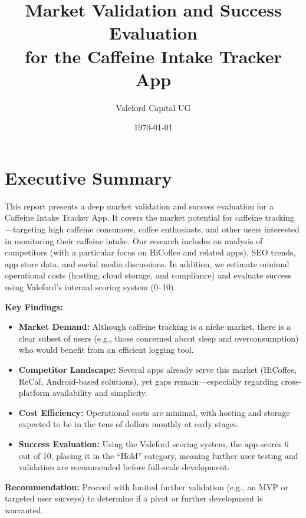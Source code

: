 \documentclass[11pt]{article}
\title{\Huge \textbf{Market Validation and Success Evaluation}\\[0.5em]
\large for the Caffeine Intake Tracker App}
\author{Valeford Capital UG}
\date{\today}
\begin{document}
\maketitle
\thispagestyle{empty}
\newpage

\tableofcontents
\newpage

\section*{Executive Summary}
This report presents a deep market validation and success evaluation for a Caffeine Intake Tracker App. It covers the market potential for caffeine tracking—targeting high caffeine consumers, coffee enthusiasts, and other users interested in monitoring their caffeine intake. Our research includes an analysis of competitors (with a particular focus on HiCoffee and related apps), SEO trends, app store data, and social media discussions. In addition, we estimate minimal operational costs (hosting, cloud storage, and compliance) and evaluate success using Valeford’s internal scoring system (0--10).

\textbf{Key Findings:}
\begin{itemize}[noitemsep]
    \item \textbf{Market Demand:} Although caffeine tracking is a niche market, there is a clear subset of users (e.g., those concerned about sleep and overconsumption) who would benefit from an efficient logging tool.
    \item \textbf{Competitor Landscape:} Several apps already serve this market (HiCoffee, ReCaf, Android-based solutions), yet gaps remain—especially regarding cross-platform availability and simplicity.
    \item \textbf{Cost Efficiency:} Operational costs are minimal, with hosting and storage expected to be in the tens of dollars monthly at early stages.
    \item \textbf{Success Evaluation:} Using the Valeford scoring system, the app scores 6 out of 10, placing it in the ``Hold'' category, meaning further user testing and validation are recommended before full-scale development.
\end{itemize}

\vspace{1em}
\textbf{Recommendation:} Proceed with limited further validation (e.g., an MVP or targeted user surveys) to determine if a pivot or further development is warranted.
\end{document}
